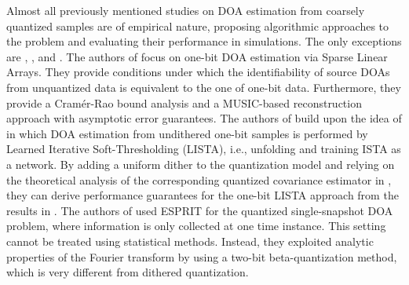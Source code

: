 Almost all previously mentioned studies on DOA estimation from coarsely quantized samples are of empirical nature, proposing algorithmic approaches to the problem and evaluating their performance in simulations. The only exceptions are \cite{sedighi2021performance}, \cite{YEES24}, and \cite{gunturk2022quantization}. The authors of \cite{sedighi2021performance} focus on one-bit DOA estimation via Sparse Linear Arrays. They provide conditions under which the identifiability of source DOAs from unquantized data is equivalent to the one of one-bit data. Furthermore, they provide a Cramér-Rao bound analysis and a MUSIC-based reconstruction approach with asymptotic error guarantees. The authors of \cite{YEES24} build upon the idea of \cite{xiao2020deepfpc} in which DOA estimation from undithered one-bit samples is performed by Learned Iterative Soft-Thresholding (LISTA), i.e., unfolding and training ISTA as a network. By adding a uniform dither to the quantization model and relying on the theoretical analysis of the corresponding quantized covariance estimator in \cite{yang2023plug}, they can derive performance guarantees for the one-bit LISTA approach from the results in \cite{chen2018theoretical}. The authors of \cite{gunturk2022quantization} used ESPRIT for the quantized single-snapshot DOA problem, where information is only collected at one time instance. This setting cannot be treated using statistical methods. Instead, they exploited analytic properties of the Fourier transform by using a two-bit beta-quantization method, which is very different from dithered quantization.